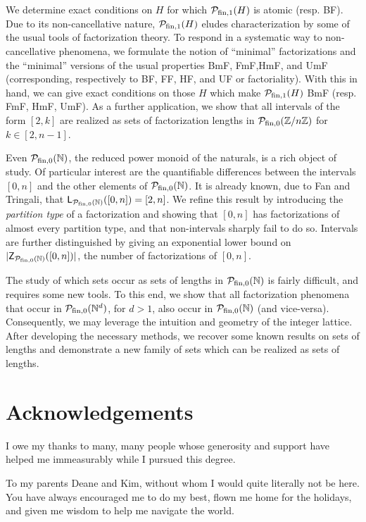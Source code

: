 We determine exact conditions on $H$ for which $\mathcal{P}_{\textrm{fin}, 1}(H)$ is atomic (resp. BF).
Due to its non-cancellative nature, $\mathcal{P}_{\textrm{fin}, 1}(H)$ eludes characterization by some of the usual tools of factorization theory.  
To respond in a systematic way to non-cancellative phenomena, we formulate the notion of ``minimal'' factorizations and the ``minimal'' versions of the usual properties BmF, FmF,HmF, and UmF (corresponding, respectively to BF, FF, HF, and UF or factoriality).
With this in hand, we can give exact conditions on those $H$ which make $\mathcal{P}_{\textrm{fin}, 1}(H)$ BmF (resp. FmF, HmF, UmF).
As a further application, we show that all intervals of the form $[2,k]$ are realized as sets of factorization lengths in $\mathcal{P}_{\textrm{fin}, 0}(\mathbb{Z}/n\mathbb{Z})$ for $k\in[2,n-1]$.

Even ${\mathcal{P}_{\textrm{fin},0}(\mathbb{N})}$, the reduced power monoid of the naturals, is a rich object of study.  
Of particular interest are the quantifiable differences between the intervals $[0,n]$ and the other elements of ${\mathcal{P}_{\textrm{fin},0}(\mathbb{N})}$.
It is already known, due to Fan and Tringali, that $\mathsf{L}_{\mathcal{P}_{\textrm{fin},0}(\mathbb{N})}([0,n]) = [2,n]$.
We refine this result by introducing the \textit{partition type} of a factorization and showing that $[0,n]$ has factorizations of almost every partition type, and that non-intervals sharply fail to do so.  
Intervals are further distinguished %
by giving an exponential lower bound on $|\mathsf{Z}_{\mathcal{P}_{\textrm{fin},0}(\mathbb{N})}([0,n])|$, the number of factorizations of $[0,n]$.


The study of which sets occur as sets of lengths in ${\mathcal{P}_{\textrm{fin},0}(\mathbb{N})}$ is fairly difficult, and requires some new tools.
To this end, we show that all factorization phenomena that occur in $\mathcal{P}_{\textrm{fin}, 0}(\mathbb{N}^d)$, for $d>1$, also occur in ${\mathcal{P}_{\textrm{fin},0}(\mathbb{N})}$ (and vice-versa).
Consequently, we may leverage the intuition and geometry of the integer lattice.  
After developing the necessary methods, we recover some known results on sets of lengths and demonstrate a new family of sets which can be realized as sets of lengths. 




\chapter{Acknowledgements}
I owe my thanks to many, many people whose generosity and support have helped me immeasurably while I pursued this degree.


To my parents Deane and Kim, without whom I would quite literally not be here.  
You have always encouraged me to do my best, flown me home for the holidays, and given me wisdom to help me navigate the world.

